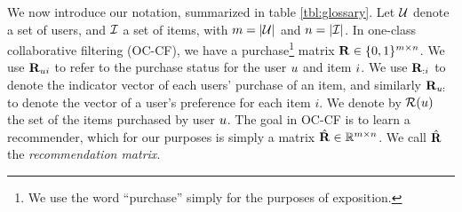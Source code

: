 
We now introduce our notation, summarized in table \ref{tbl:glossary}. %
Let $\mathcal{U}$ denote a set of users, and $\mathcal{I}$ a set of items,
with $m = | \mathcal{U} |$ and $n = | \mathcal{I} |$.
In one-class collaborative filtering (OC-CF), we have a purchase\footnote{We use the word ``purchase'' simply for the purposes of exposition.} 
matrix $\mathbf{R} \in \{ 0, 1 \}^{m \times n}$. %
We use $\mathbf{R}_{ui}$ to refer to the purchase status for the user $u$ and item $i$.
We use $\mathbf{R}_{:i}$ to denote the indicator vector of each users' purchase of an item, and similarly $\mathbf{R}_{u:}$ to denote the vector of a user's preference for each item $i$.
We denote by  $\mathcal{R}(u)$ the set of the items purchased by user $u$. The goal in OC-CF is to learn a recommender, which for our purposes is simply a matrix $\hat{\mathbf{R}} \in \mathbb{R}^{m \times n}$. %
We call $\hat{\mathbf{R}}$ the \emph{recommendation matrix}.

\begin{table}[t]
	\centering
	\caption{Commonly used symbols.}
	\label{tbl:glossary}
\end{table}

